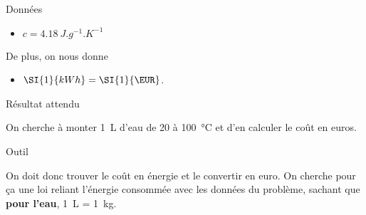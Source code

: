 \documentclass[../main/main.tex]{subfiles}
\begin{document}
\begin{enumerate}
\begin{tcbraster}[raster columns=2, raster equal height=rows]
\begin{NCdefi}[]{Données}
\begin{itemize}
				      \item $c = \SI{4.18}{J.g^{-1}.K^{-1}}$
			      \end{itemize}
			      De plus, on nous donne
			      \begin{itemize}
				      \item $ \SI{1}{kWh} = \SI{1}{\EUR}$.
			      \end{itemize}
		      \end{NCdefi}
		      \begin{tcolorbox}[blankest, raster multicolumn=1, space to=\myspace]
			      \begin{tcbraster}[raster columns=1]
				      \begin{NCprop}[add to natural height=\myspace]{Résultat attendu}

					      On cherche à monter \SI{1}{L} d'eau de 20 à
					      \SI{100}{\degreeCelsius} et d'en calculer le coût en
					      euros.

				      \end{NCprop}
				      \begin{NCrapp}[]{Outil}

					      On doit donc trouver le coût en énergie et le convertir
					      en euro. On cherche pour ça une loi reliant l'énergie
					      consommée avec les données du problème, sachant que
					      \textbf{pour l'eau}, \SI{1}{L} = \SI{1}{kg}.


\end{NCrapp}
\end{tcbraster}
\end{tcolorbox}
\end{tcbraster}
\end{enumerate}
\end{document}
